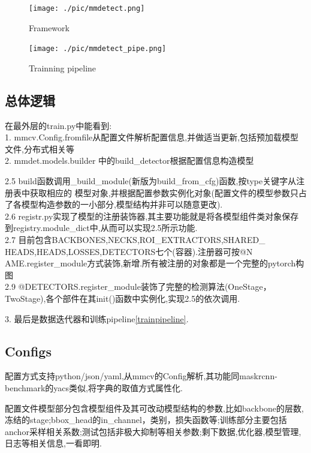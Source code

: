\documentclass[UTF8]{ctexart}
\begin{document}
\begin{figure}[htbp]
	\centering
	\begin{minipage}[t]{0.48\textwidth}
	\centering
	\texttt{[image: ./pic/mmdetect.png]}
	\caption{ Framework }
	\end{minipage}
	\begin{minipage}[t]{0.48\textwidth}
	\centering
	\texttt{[image: ./pic/mmdetect\_pipe.png]}
	\caption{Trainning pipeline}
	\label{trainpipe_pic}
	\end{minipage}
\end{figure}

\subsection{总体逻辑}
在最外层的train.py中能看到:\\
1. mmcv.Config.fromfile从配置文件解析配置信息,并做适当更新,包括预加载模型文件,分布式相关等\\
2. mmdet.models.builder 中的build\_detector根据配置信息构造模型

\begin{adjustwidth}{0.5cm}{0cm}

2.5 build函数调用\_build\_module(新版为build\_from\_cfg)函数,按type关键字从注册表中获取相应的
模型对象,并根据配置参数实例化对象(配置文件的模型参数只占了各模型构造参数的一小部分,模型结构并非可以随意更改).\\
2.6 registr.py实现了模型的注册装饰器,其主要功能就是将各模型组件类对象保存到registry.module\_dict中,从而可以实现2.5所示功能.\\
2.7 目前包含BACKBONES,NECKS,ROI\_EXTRACTORS,SHARED\_\\
HEADS,HEADS,LOSSES,DETECTORS七个(容器).注册器可按@N
AME.register\_module方式装饰,新增.所有被注册的对象都是一个完整的pytorch构图\\
2.9 @DETECTORS.register\_module装饰了完整的检测算法(OneStage，TwoStage),各个部件在其init()函数中实例化,实现2.5的依次调用.
\end{adjustwidth}
3. 最后是数据迭代器和训练pipeline\ref{trainpipeline}.

\subsection{Configs}
配置方式支持python/json/yaml,从mmcv的Config解析,其功能同maskrcnn-benchmark的yacs类似,将字典的取值方式属性化.

配置文件模型部分包含模型组件及其可改动模型结构的参数,比如backbone的层数,冻结的stage;bbox\_head的in\_channel，类别，损失函数等;训练部分主要包括anchor采样相关系数;测试包括非极大抑制等相关参数;剩下数据,优化器,模型管理,日志等相关信息,一看即明.
\end{document}
